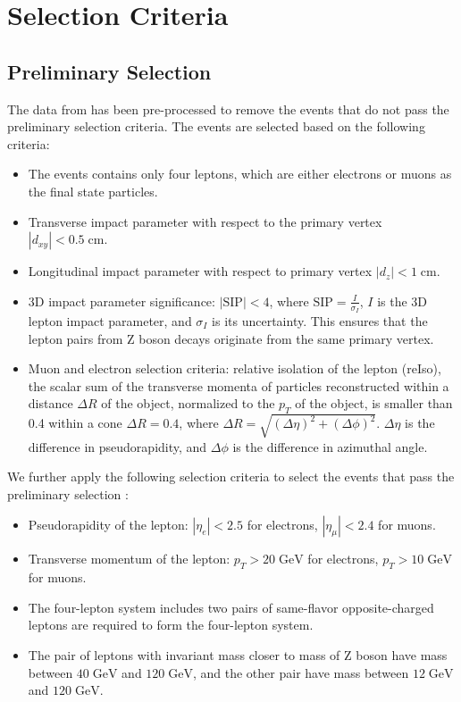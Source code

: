 \section{Selection Criteria}

\subsection{Preliminary Selection}
The data from \cite{MIT:Higgs4L2020,Hu2020HiggsTo4L} has been pre-processed to remove the events that do not pass the preliminary selection criteria. The events are selected based on the following criteria:

\begin{itemize}
  \item The events contains only four leptons, which are either electrons or muons as the final state particles.
  \item Transverse impact parameter with respect to the primary vertex $|d_{xy}| < 0.5\;\text{cm}$.
  \item Longitudinal impact parameter with respect to primary vertex $|d_{z}| < 1\;\text{cm}$.
  \item 3D impact parameter significance: $|\text{SIP}| < 4$, where $\text{SIP} = \frac{I}{\sigma_I}$, $I$ is the 3D lepton impact parameter, and $\sigma_I$ is its uncertainty. This ensures that the lepton pairs from Z boson decays originate from the same primary vertex.
  \item Muon and electron selection criteria: relative isolation of the lepton (reIso), the scalar sum of the transverse momenta of particles reconstructed within a distance $\Delta R$ of the object, normalized to the $p_T$ of the object, is smaller than 0.4 within a cone $\Delta R = 0.4$, where $\Delta R = \sqrt{(\Delta\eta)^2 + (\Delta\phi)^2}$. $\Delta \eta$ is the difference in pseudorapidity, and $\Delta \phi$ is the difference in azimuthal angle. 
\end{itemize}

We further apply the following selection criteria to select the events that pass the preliminary selection \cite{CMS:2012qbp}:
\begin{itemize}
  \item Pseudorapidity of the lepton: $|\eta_e| < 2.5$ for electrons, $|\eta_\mu| < 2.4$ for muons.
  \item Transverse momentum of the lepton: $p_T > 20\;\text{GeV}$ for electrons, $p_T > 10\;\text{GeV}$ for muons.
  \item The four-lepton system includes two pairs of same-flavor opposite-charged leptons are required to form the four-lepton system. 
  \item The pair of leptons with invariant mass closer to mass of Z boson have mass between $40\;\text{GeV}$ and $120\;\text{GeV}$, and the other pair have mass between $12\;\text{GeV}$ and $120\;\text{GeV}$.
\end{itemize}

